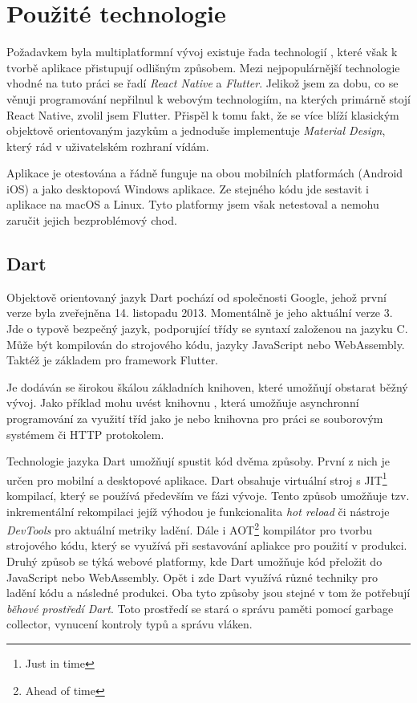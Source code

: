 \documentclass[
  biblatex,
  figures=true,
  tables=false,
  glossaries,
  index
]{kidiplom}
\begin{document}
\section{Použité technologie}

Požadavkem byla multiplatformní vývoj existuje řada technologií \cite{jetbrains-crossplatform}, které však k tvorbě aplikace přistupují odlišným způsobem. Mezi nejpopulárnější technologie vhodné na tuto práci se řadí \textit{React Native} a \textit{Flutter}. Jelikož jsem za dobu, co se věnuji programování nepřilnul k webovým technologiím, na kterých primárně stojí React Native, zvolil jsem Flutter. Přispěl k tomu fakt, že se více blíží klasickým objektově orientovaným jazykům a jednoduše implementuje \textit{Material Design}, který rád v uživatelském rozhraní vídám.

Aplikace je otestována a řádně funguje na obou mobilních platformách (Android iOS) a jako desktopová Windows aplikace. Ze stejného kódu jde sestavit i aplikace na macOS a Linux. Tyto platformy jsem však netestoval a nemohu zaručit jejich bezproblémový chod.

\subsection{Dart}
Objektově orientovaný jazyk Dart \cite{dart} pochází od společnosti Google, jehož první verze byla zveřejněna 14. listopadu 2013. Momentálně je jeho aktuální verze 3. Jde o typově bezpečný jazyk, podporující třídy se syntaxí založenou na jazyku C. Může být kompilován do strojového kódu, jazyky JavaScript nebo WebAssembly. Taktéž je základem pro framework Flutter.

\kiinlinecode{}{;}
Je dodáván se širokou škálou základních knihoven, které umožňují obstarat běžný vývoj. Jako příklad mohu uvést knihovnu , která umožňuje asynchronní programování za využití tříd jako je  nebo knihovna  pro práci se souborovým systémem či HTTP protokolem.

Technologie jazyka Dart umožňují spustit kód dvěma způsoby. První z nich je určen pro mobilní a desktopové aplikace. Dart obsahuje virtuální stroj s JIT\footnote{Just in time} kompilací, který se používá především ve fázi vývoje. Tento způsob umožňuje tzv. inkrementální rekompilaci jejíž výhodou je funkcionalita \textit{hot reload} či nástroje \textit{DevTools} pro aktuální metriky ladění. Dále i AOT\footnote{Ahead of time} kompilátor pro tvorbu strojového kódu, který se využívá při sestavování apliakce pro použití v produkci. Druhý způsob se týká webové platformy, kde Dart umožňuje kód přeložit do JavaScript nebo WebAssembly. Opět i zde Dart využívá různé techniky pro ladění kódu a následné produkci. Oba tyto způsoby jsou stejné v tom že potřebují \textit{běhové prostředí Dart}. Toto prostředí se stará o správu paměti pomocí garbage collector, vynucení kontroly typů a správu vláken.
\end{document}
